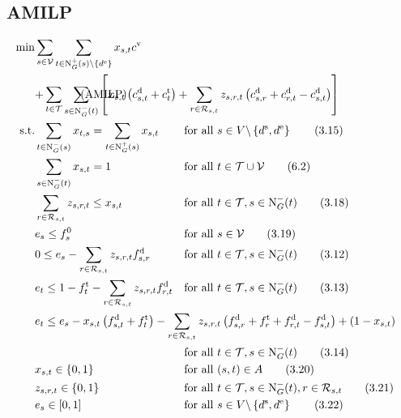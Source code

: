 \subsection{AMILP}

\begin{align}
	\min & \sum_{s\in\mathcal{V}} \sum_{t\in\Nout(s)\backslash\{d^{\operatorname{e}}\}} x_{s,t}c^{\operatorname{v}} \nonumber \\
	& \omit\rlap{$\displaystyle{ + \sum_{t\in\mathcal{T}} \sum_{s\in\Nin(t)} \left[x_{s,t}\left(c_{s,t}^{\operatorname{d}}+c_{t}^{\operatorname{t}}\right) + \sum_{r\in\Rst} z_{s,r,t}\left(c_{s,r}^{\operatorname{d}}+c_{r,t}^{\operatorname{d}}-c_{s,t}^{\operatorname{d}}\right)\right]}$} \tag{AMILP} \label{eq:AMILP} \\
	\text{s.t.} & \sum_{t\in\Nin(s)} x_{t,s} = \sum_{t\in\Nout(s)} x_{s,t} & & \text{for all } s\in V\backslash\left\{d^{\operatorname{s}},d^{\operatorname{e}}\right\} \tag{3.15} \\
	& \sum_{s\in\Nin(t)} x_{s,t} = 1 & & \text{for all } t\in\mathcal{T}\cup\mathcal{V} \tag{6.2} \\
	& \sum_{r\in\Rst} z_{s,r,t} \leq x_{s,t} & & \text{for all } t\in\mathcal{T}, s\in\Nin(t) \tag{3.18} \\
	& e_s \leq f_s^0 & & \text{for all } s\in\mathcal{V} \tag{3.19} \\
	& 0 \leq e_s - \sum_{r\in\Rst} z_{s,r,t}\fd_{s,r} & & \text{for all } t\in\mathcal{T}, s\in\Nin(t) \tag{3.12} \\
	& e_t \leq 1 - \ft_t - \sum_{r\in\Rst} z_{s,r,t}\fd_{r,t} & & \text{for all } t\in\mathcal{T}, s\in\Nin(t) \tag{3.13} \\
	& \omit\rlap{$\displaystyle{e_t \leq e_s - x_{s,t}\left(f_{s,t}^{\operatorname{d}}+f_t^{\operatorname{t}}\right) - \sum_{r\in\Rst} z_{s,r,t}\left(\fd_{s,r}+\ft_r+\fd_{r,t}-\fd_{s,t}\right) + \left(1-x_{s,t}\right)}$} \nonumber \\
	& & & \text{for all } t\in\mathcal{T}, s\in\Nin(t) \tag{3.14} \\
	& x_{s,t}\in\{0,1\} & & \text{for all } (s,t)\in A \tag{3.20}\\
	& z_{s,r,t}\in\{0,1\} & & \text{for all } t\in\mathcal{T},s\in\Nin(t),r\in\Rst \tag{3.21} \\
	& e_s\in[0,1] & & \text{for all } s\in V\backslash\left\{d^{\operatorname{s}},d^{\operatorname{e}}\right\} \tag{3.22}
\end{align}
